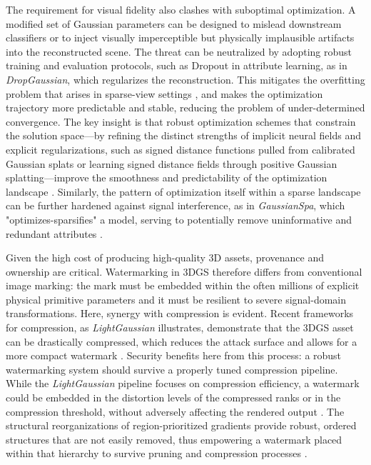 \documentclass[11pt,a4paper]{article}
\begin{document}
The requirement for visual fidelity also clashes with suboptimal optimization. A modified set of Gaussian parameters can be designed to mislead downstream classifiers or to inject visually imperceptible but physically implausible artifacts into the reconstructed scene. The threat can be neutralized by adopting robust training and evaluation protocols, such as Dropout in attribute learning, as in \emph{DropGaussian}, which regularizes the reconstruction. This mitigates the overfitting problem that arises in sparse-view settings \cite{arxiv:2504.00773v1,arxiv:2411.03637v1}, and makes the optimization trajectory more predictable and stable, reducing the problem of under-determined convergence. The key insight is that robust optimization schemes that constrain the solution space---by refining the distinct strengths of implicit neural fields and explicit regularizations, such as signed distance functions pulled from calibrated Gaussian splats or learning signed distance fields through positive Gaussian splatting---improve the smoothness and predictability of the optimization landscape \cite{arxiv:2410.14189v1,arxiv:2411.15723v4}. Similarly, the pattern of optimization itself within a sparse landscape can be further hardened against signal interference, as in \emph{GaussianSpa}, which "optimizes-sparsifies" a model, serving to potentially remove uninformative and redundant attributes \cite{arxiv:2411.06019v3}.

Given the high cost of producing high-quality 3D assets, provenance and ownership are critical. Watermarking in 3DGS therefore differs from conventional image marking: the mark must be embedded within the often millions of explicit physical primitive parameters and it must be resilient to severe signal-domain transformations. Here, synergy with compression is evident. Recent frameworks for compression, as \emph{LightGaussian} illustrates, demonstrate that the 3DGS asset can be drastically compressed, which reduces the attack surface and allows for a more compact watermark \cite{arxiv:2311.17245v5}. Security benefits here from this process: a robust watermarking system should survive a properly tuned compression pipeline. While the \emph{LightGaussian} pipeline focuses on compression efficiency, a watermark could be embedded in the distortion levels of the compressed ranks or in the compression threshold, without adversely affecting the rendered output \cite{arxiv:2311.17245v5,arxiv:2406.01597v2}. The structural reorganizations of region-prioritized gradients provide robust, ordered structures that are not easily removed, thus empowering a watermark placed within that hierarchy to survive pruning and compression processes \cite{arxiv:2411.12788v2}.
\end{document}
